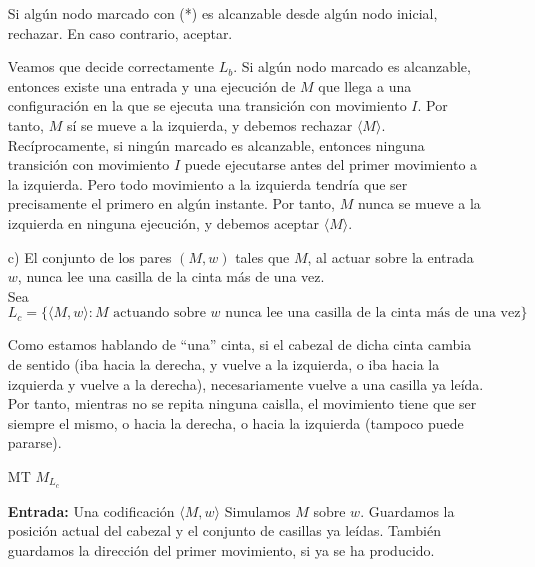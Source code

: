 \begin{ejercicio}
\begin{itemize}
\begin{algorithm}
\begin{algorithmic}
                \State Si algún nodo marcado con (*) es alcanzable desde algún nodo inicial, rechazar.
                \State En caso contrario, aceptar.
                \end{algorithmic}
        \end{algorithm}

        Veamos que decide correctamente $L_b$. Si algún nodo marcado es alcanzable,
        entonces existe una entrada y una ejecución de $M$ que llega a una
        configuración en la que se ejecuta una transición con movimiento $I$. Por
        tanto, $M$ sí se mueve a la izquierda, y debemos rechazar
        $\langle M\rangle$. \\

        Recíprocamente, si ningún marcado es alcanzable, entonces ninguna transición
        con movimiento $I$ puede ejecutarse antes del primer movimiento a la
        izquierda. Pero todo movimiento a la izquierda tendría que ser precisamente
        el primero en algún instante. Por tanto, $M$ nunca se mueve a la izquierda
        en ninguna ejecución, y debemos aceptar $\langle M\rangle$.

        \item[c)] El conjunto de los pares $(M, w)$ tales que $M$, al actuar sobre la entrada $w$, nunca lee una casilla de la cinta más de una vez. \\
        
        Sea $$L_c = \{\langle M, w \rangle : M \text{ actuando sobre $w$ nunca lee una casilla de la cinta más de una vez}\}$$

        Como estamos hablando de ``una'' cinta, si el cabezal de dicha cinta cambia de sentido (iba hacia la derecha, 
        y vuelve a la izquierda, o iba hacia la izquierda y vuelve a la derecha), necesariamente vuelve a una casilla
        ya leída. \\
        
        Por tanto, mientras no se repita ninguna caislla, el movimiento tiene que ser siempre el mismo,
        o hacia la derecha, o hacia la izquierda (tampoco puede pararse). \\

        \begin{algorithm}
            \caption{MT $M_{L_c}$}
            \begin{algorithmic}
            \State \textbf{Entrada:} Una codificación $\langle M,w\rangle$
            \State Simulamos $M$ sobre $w$.
            \State Guardamos la posición actual del cabezal y el conjunto de casillas ya leídas.
            \State También guardamos la dirección del primer movimiento, si ya se ha producido.


\end{algorithmic}
\end{algorithm}
\end{itemize}
\end{ejercicio}
